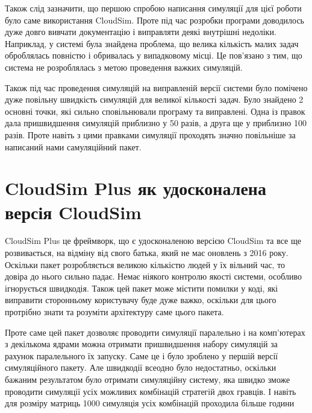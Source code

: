 Також слід зазначити, що першою спробою написання симуляції для цієї роботи було саме використання CloudSim. Проте під час розробки програми доводилось дуже довго вивчати документацію і виправляти деякі внутрішні недоліки. Наприклад, у системі була знайдена проблема, що велика кількість малих задач оброблялась повністю і обривалась у випадковому місці. Це пов'язано з тим, що система не розроблялась з метою проведення важких симуляцій.

Також під час проведення симуляцій на виправленій версії системи було помічено дуже повільну швидкість симуляцій для великої кількості задач. Було знайдено 2 основні точки, які сильно сповільнювали програму та виправлені. Одна із правок дала пришвидшення симуляцій приблизно у 50 разів, а друга ще у приблизно 100 разів. Проте навіть з цими правками симуляції проходять значно повільніше за написаний нами самуляційний пакет.

\section{CloudSim Plus як удосконалена версія CloudSim}

CloudSim Plus \cite{CloudSimPlus} це фреймворк, що є удосконаленою версією CloudSim та все ще розвивається, на відміну від свого батька, який не має оновлень з 2016 року. Оскільки пакет розробляється великою кількістю людей у їх вільний час, то довіра до нього сильно падає. Немає ніякого контролю якості системи, особливо ігнорується швидкодія. Також цей пакет може містити помилки у коді, які виправити сторонньому користувачу буде дуже важко, оскільки для цього протрібно знати та розуміти архітектуру саме цього пакета.

Проте саме цей пакет дозволяє проводити симуляції паралельно і на комп'ютерах з декількома ядрами можна отримати пришвидшення набору симуляцій за рахунок паралельного їх запуску. Саме це і було зроблено у першій версії симуляційного пакету. Але швидкодії всеодно було недостатньо, оскільки бажаним результатом було отримати симуляційну систему, яка швидко зможе проводити симуляції усіх можливих комбінацій стратегій двох гравців. І навіть для розміру матриць 1000 симуляція усіх комбінацій проходила більше години